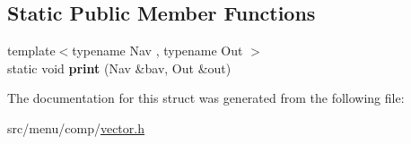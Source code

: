 \subsection*{Static Public Member Functions}
\begin{DoxyCompactItemize}
\item 
\mbox{\label{structVectorMenu_a56574a08c84e6f71efe4005742f2fbfe}} 
{\footnotesize template$<$typename Nav , typename Out $>$ }\\static void {\bfseries print} (Nav \&bav, Out \&out)
\end{DoxyCompactItemize}


The documentation for this struct was generated from the following file\+:\begin{DoxyCompactItemize}
\item 
src/menu/comp/\hyperlink{vector_8h}{vector.\+h}\end{DoxyCompactItemize}
